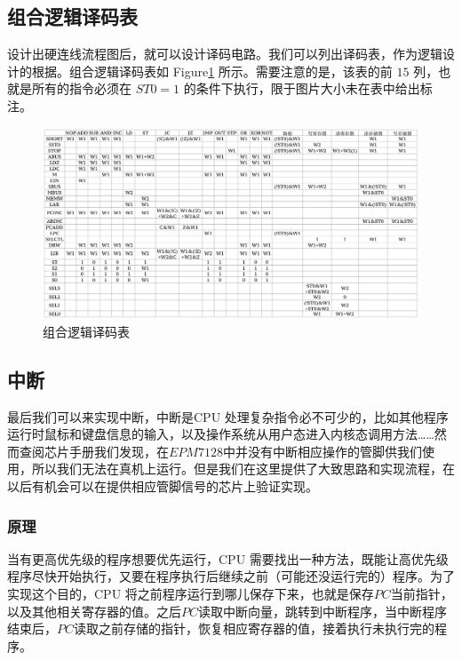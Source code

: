 \documentclass[12pt]{article}
\begin{document}
{    \subsection{组合逻辑译码表} 
        设计出硬连线流程图后，就可以设计译码电路。我们可以列出译码表，作为逻辑设计的根据。组合逻辑译码表如 Figure\ref{fig:5-4} 所示。需要注意的是，该表的前 $15$ 列，也就是所有的指令必须在 $ST0=1$ 的条件下执行，限于图片大小未在表中给出标注。
        
        \begin{figure}[!ht]
            \centering
            \includegraphics[width=1.0\textwidth]{组合逻辑译码表.png}
            \caption{组合逻辑译码表}
            \label{fig:5-4}
        \end{figure}
        
    \subsection{中断}
    最后我们可以来实现中断，中断是CPU 处理复杂指令必不可少的，比如其他程序运行时鼠标和键盘信息的输入，以及操作系统从用户态进入内核态调用方法……然而查阅芯片手册我们发现，在$EPM7128$中并没有中断相应操作的管脚供我们使用，所以我们无法在真机上运行。但是我们在这里提供了大致思路和实现流程，在以后有机会可以在提供相应管脚信号的芯片上验证实现。
    
        \subsubsection{原理}
        当有更高优先级的程序想要优先运行，CPU 需要找出一种方法，既能让高优先级程序尽快开始执行，又要在程序执行后继续之前（可能还没运行完的）程序。为了实现这个目的，CPU 将之前程序运行到哪儿保存下来，也就是保存$PC$当前指针，以及其他相关寄存器的值。之后$PC$读取中断向量，跳转到中断程序，当中断程序结束后，$PC$读取之前存储的指针，恢复相应寄存器的值，接着执行未执行完的程序。
        
}
\end{document}
